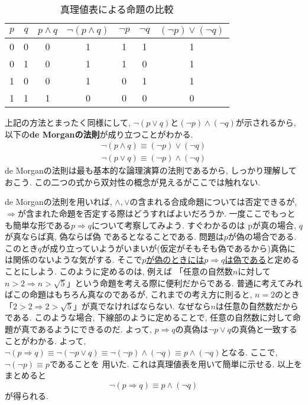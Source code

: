         \begin{table}[h]
            \centering
            \begin{tabular}{cc||cc|ccc}
                $p$ & $q$ & $p\land q$ & $\lnot(p\land q)$ & $\lnot p$ & $\lnot q$ & $(\lnot p)\lor(\lnot q)$ \\\hline
                0 & 0 & 0 & 1 & 1 & 1 & 1\\
                0 & 1 & 0 & 1 & 1 & 0 & 1\\
                1 & 0 & 0 & 1 & 0 & 1 & 1\\
                1 & 1 & 1 & 0 & 0 & 0 & 0\\
            \end{tabular}
            \caption{真理値表による命題の比較}
        \end{table}

        上記の方法とまったく同様にして, $\lnot (p\lor q)$と$(\lnot p)\land (\lnot q)$が示されるから, 以下の\textbf{de Morganの法則}が成り立つことがわかる.
        \begin{align}
            \lnot (p\land q) \equiv (\lnot p) \lor (\lnot q) \label{eq:集合論基礎:論理ドモルガン1}\\
            \lnot (p\lor q) \equiv (\lnot p) \land (\lnot q) \label{eq:集合論基礎:論理ドモルガン2}
        \end{align}
        de Morganの法則は最も基本的な論理演算の法則であるから, しっかり理解しておこう. この二つの式から双対性の概念が見えるがここでは触れない.

        de Morganの法則を用いれば, $\land,\lor$の含まれる合成命題については否定できるが, $\Rightarrow$が含まれた命題を否定する際はどうすればよいだろうか.
        一度ここでもっとも簡単な形である$p \Rightarrow q$について考察してみよう. すぐわかるのは pが真の場合, $q$が真ならば真, 偽ならば偽
        であるとなることである. 問題は$p$が偽の場合である. このとき$q$が成り立っていようがいまいが(仮定がそもそも偽であるから)真偽には関係のないような気がする.
        そこで\underline{$p$が偽のときには$p\Rightarrow q$は偽である}と定めることにしよう. このように定めるのは, 例えば
        「任意の自然数$n$に対して$n>2\Rightarrow n > \sqrt{5}$」という命題を考える際に便利だからである. 普通に考えてみればこの命題はもちろん真なのであるが, 
        これまでの考え方に則ると, $n=2$のとき「$2>2\Rightarrow 2>\sqrt{5}$」が真でなければならない. なぜなら$n$は\.{任}\.{意}\.{の}自然数だからである. このような場合, 
        下線部のように定めることで, 任意の自然数に対して命題が真であるようにできるのだ. よって, $p\Rightarrow q$の真偽は$\lnot p\lor q$の真偽と一致することがわかる.
        よって, $\lnot (p\Rightarrow q)\equiv \lnot (\lnot p\lor q)\equiv \lnot(\lnot p) \land (\lnot q)\equiv p\land (\lnot q)$となる. ここで, $\lnot (\lnot p)\equiv p$であることを
        用いた. これは真理値表を用いて簡単に示せる.
        以上をまとめると
        \begin{equation}
            \lnot (p \Rightarrow q) \equiv p \land (\lnot q) \label{eq:集合論基礎:ならばの否定}
        \end{equation}
        が得られる. \\

